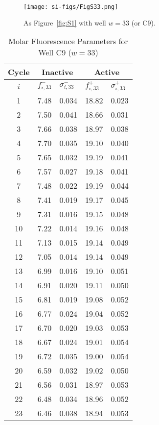                \begin{figure}
                    \centering
                    \texttt{[image: si-figs/FigS33.png]}
                    \caption{
                        As Figure~\ref{fig:S1} with well $w=33$ (or C9).
                    }
                \end{figure}
                \clearpage
    \begin{table}
        \caption{Molar Fluorescence Parameters for Well C9 ($w=33$)}
        \centering
        \begin{tabular}{c|ll|ll}
            Cycle & \multicolumn{2}{c|}{Inactive} & \multicolumn{2}{c}{Active} \\
            \hline
            $i$ & $f_{i,33}^{-}$ & $\sigma_{i,33}^{-}$ &  $f_{i,33}^{+}$ & $\sigma_{i,33}^{+}$ \\
            \hline
    1 & 7.48 & 0.034 & 18.82 & 0.023 \\
2 & 7.50 & 0.041 & 18.66 & 0.031 \\
3 & 7.66 & 0.038 & 18.97 & 0.038 \\
4 & 7.70 & 0.035 & 19.10 & 0.040 \\
5 & 7.65 & 0.032 & 19.19 & 0.041 \\
6 & 7.57 & 0.027 & 19.18 & 0.041 \\
7 & 7.48 & 0.022 & 19.19 & 0.044 \\
8 & 7.41 & 0.019 & 19.17 & 0.045 \\
9 & 7.31 & 0.016 & 19.15 & 0.048 \\
10 & 7.22 & 0.014 & 19.16 & 0.048 \\
11 & 7.13 & 0.015 & 19.14 & 0.049 \\
12 & 7.05 & 0.014 & 19.14 & 0.049 \\
13 & 6.99 & 0.016 & 19.10 & 0.051 \\
14 & 6.91 & 0.020 & 19.11 & 0.050 \\
15 & 6.81 & 0.019 & 19.08 & 0.052 \\
16 & 6.77 & 0.024 & 19.04 & 0.052 \\
17 & 6.70 & 0.020 & 19.03 & 0.053 \\
18 & 6.67 & 0.024 & 19.01 & 0.054 \\
19 & 6.72 & 0.035 & 19.00 & 0.054 \\
20 & 6.59 & 0.032 & 19.02 & 0.050 \\
21 & 6.56 & 0.031 & 18.97 & 0.053 \\
22 & 6.48 & 0.034 & 18.96 & 0.052 \\
23 & 6.46 & 0.038 & 18.94 & 0.053 \\

\end{tabular}
\end{table}
